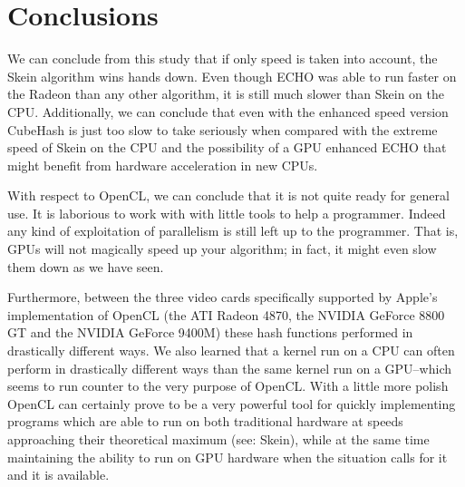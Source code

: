 \section*{Conclusions}

We can conclude from this study that if only speed is taken into account, the Skein algorithm wins hands down.
Even though ECHO was able to run faster on the Radeon than any other algorithm, it is still much slower than Skein on the CPU.
Additionally, we can conclude that even with the enhanced speed version CubeHash is just too slow to take seriously when compared with the extreme speed of Skein on the CPU and the possibility of a GPU enhanced ECHO that might benefit from hardware acceleration in new CPUs.

With respect to OpenCL, we can conclude that it is not quite ready for general use.
It is laborious to work with with little tools to help a programmer.
Indeed any kind of exploitation of parallelism is still left up to the programmer.
That is, GPUs will not magically speed up your algorithm; in fact, it might even slow them down as we have seen.

Furthermore, between the three video cards specifically supported by Apple's implementation of OpenCL (the ATI Radeon 4870, the NVIDIA GeForce 8800 GT and the NVIDIA GeForce 9400M) these hash functions performed in drastically different ways.
We also learned that a kernel run on a CPU can often perform in drastically different ways than the same kernel run on a GPU--which seems to run counter to the very purpose of OpenCL.
With a little more polish OpenCL can certainly prove to be a very powerful tool for quickly implementing programs which are able to run on both traditional hardware at speeds approaching their theoretical maximum (see: Skein), while at the same time maintaining the ability to run on GPU hardware when the situation calls for it and it is available.